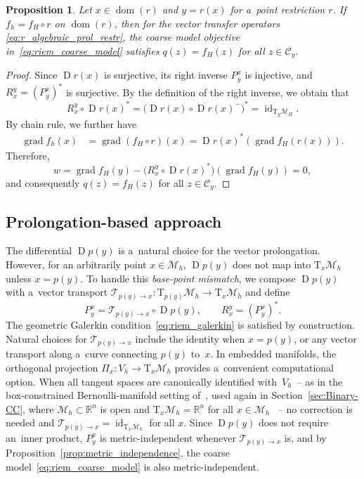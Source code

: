 \documentclass[11pt,reqno]{amsart}
\theoremstyle{plain}
\newtheorem{prop}[thm]{Proposition}
\newcommand\R{\mathbb R}
\DeclareMathOperator{\Drm}{D}
\DeclareMathOperator{\grad}{grad}
\DeclareMathOperator{\id}{id}
\DeclareMathOperator{\dom}{dom}
\def\restr{r}
\newcommand\calC{\mathcal C}
\newcommand\calT{\mathcal T}
\newcommand{\M}{\mathcal{M}}
\newcommand{\Tan}{\mathrm{T}}
\begin{document}
	\begin{prop}\label{prop:algebraic1} Let $x \in \dom(r)$ and $y = \restr(x)$ for a~point restriction $\restr$.
		If $f_h = f_H \circ \restr$ on $\dom(r)$, then for the vector transfer operators \eqref{eq:r_algebraic_prol_restr}, the coarse model objective in~\eqref{eq:riem_coarse_model} satisfies $q(z) = f_H(z)$ for all $z\in \calC_{y}$.
	\end{prop}
	\begin{proof}
		Since $\Drm \restr(x)$ is surjective, its right inverse $P_{y}^{x}$ is injective, and $R_{x}^{y} = (P_{y}^{x})^\ast$ is surjective. 
		By the definition of the right inverse, we obtain that
		\[
		R_{x}^{y} \circ \Drm \restr(x)^\ast 
		= \big(\Drm \restr(x)\circ\Drm \restr(x)^-\big)^\ast
		= \id_{\Tan_{y}\M_H}.
		\]
		By chain rule, we further have 
		\begin{align*}
			\grad f_h(x) &= \grad (f_H \circ r)(x) 
			= \Drm \restr(x)^\ast(\grad f_H(\restr(x))).
		\end{align*}
		Therefore, 
		\[
		w 
		= \grad f_H(y)-\big(R_{x}^{y}\circ \Drm \restr(x)^\ast\big)(\grad f_H(y))
		= 0,
		\]
		and consequently $q(z) = f_H(z)$  for all $z \in \calC_{y}$.
	\end{proof}
	
	\subsection{Prolongation-based approach}\label{sec:prolongation-based}
	The differential $\Drm p(y)$ is a~natural choice for the vector prolongation. However, for an arbitrarily point $x \in \M_h$, $\Drm p(y)$ does not map into $\Tan_x\M_h$ unless $x = p(y)$. To handle this \emph{base-point mismatch}, we compose $\Drm p(y)$ with a~vector transport $\calT_{p(y)\to x}\colon \Tan_{p(y)}\M_h \to \Tan_x\M_h$ and define
	\begin{equation} \label{eq:p_geom_prol_restr}
		P_y^x = \calT_{p(y)\to x} \circ \Drm p(y), \qquad R_x^y = (P_y^x)^\ast.
	\end{equation}
	The geometric Galerkin condition~\eqref{eq:riem_galerkin} is satisfied by construction. Natural choices for $\calT_{p(y)\to x}$ include the identity when $x = p(y)$, or any vector transport along a~curve connecting $p(y)$ to~$x$. In embedded manifolds, the
	orthogonal projection $\Pi_x\colon V_h \to \Tan_x\M_h$ provides a~convenient computational option. When all tangent spaces are canonically identified with~$V_h$~-- as in the box-constrained Bernoulli-manifold setting of~\cite{MuePZ23}, used again in Section~\ref{sec:Binary-CC}, where $\M_h \subset \R^n$ is open 
	and $\Tan_x\M_h = \R^n$ for all $x\in\M_h$
	~-- no correction is needed and 
	$\calT_{p(y)\to x} = \id_{\Tan_x\M_h}$ for all $x$. Since $\Drm p(y)$ does not require an~inner product, $P_y^x$ is metric-independent whenever $\calT_{p(y)\to x}$ is, and by Proposition~\ref{prop:metric_independence}, the coarse model~\eqref{eq:riem_coarse_model} is also metric-independent.
	
\end{document}
